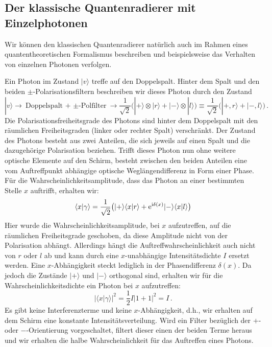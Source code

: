 \subsection{Der klassische Quantenradierer mit Einzelphotonen}

Wir k\"onnen den klassischen Quantenradierer nat\"urlich auch im Rahmen eines
quantentheoretischen Formalismus beschreiben und beispielsweise das Verhalten von
einzelnen Photonen verfolgen. 

Ein Photon im Zustand $|v\rangle$ treffe auf den Doppelspalt. Hinter dem Spalt und den beiden
$\pm$-Polarisationsfiltern beschreiben wir dieses Photon durch den Zustand
\begin{equation}
\label{eq_DSsingle1}
          |v \rangle \longrightarrow \mbox{Doppelspalt + $\pm$-Polfilter} \longrightarrow 
              \frac{1}{\sqrt{2}} \big(  |+\rangle \otimes |r\rangle + |-\rangle \otimes |l\rangle \big) 
              \equiv \frac{1}{\sqrt{2}} \big(  |+ , r\rangle + |- , l\rangle \big)   \, .
\end{equation}
Die Polarisationsfreiheitsgrade des Photons sind hinter dem Doppelspalt mit den
r\"aumlichen Freiheitsgraden (linker oder rechter Spalt) verschr\"ankt. Der Zustand des Photons
besteht aus zwei Anteilen, die sich jeweils auf einen Spalt und die dazugeh\"orige Polarisation
beziehen. Trifft dieses Photon nun ohne weitere optische Elemente auf den Schirm,
besteht zwischen den beiden Anteilen eine vom Auftreffpunkt abh\"angige optische 
Wegl\"angendifferenz in Form einer Phase. F\"ur die Wahr\-schein\-lich\-keits\-ampli\-tude, dass das Photon
an einer bestimmten Stelle $x$ auftrifft, erhalten wir:
\begin{equation}
\label{eq_DSsingle2}
   \langle x | \gamma \rangle = \frac{1}{\sqrt{2}}
               \big(  |+ \rangle \langle x | r\rangle +{\rm e}^{{\rm i}\delta(x)} |- \rangle \langle x  | l\rangle \big)
\end{equation}
Hier wurde die Wahrscheinlichkeitsamplitude, bei $x$ aufzutreffen, auf die r\"aumlichen Freiheitsgrade 
geschoben, da diese Amplitude nicht von der Polarisation abh\"angt. Allerdings h\"angt die
Auftreffwahrscheinlichkeit auch nicht von $r$ oder $l$ ab und kann durch eine $x$-unabh\"angige
Intensit\"atsdichte $I$ ersetzt werden. Eine $x$-Abh\"angigkeit steckt lediglich in der
Phasendifferenz $\delta(x)$. Da jedoch die Zust\"ande $|+\rangle$ und $|-\rangle$
orthogonal sind, erhalten wir f\"ur die Wahrscheinlichkeitsdichte ein Photon bei $x$ aufzutreffen:
\begin{equation}
  | \langle x | \gamma \rangle |^2 =  \frac{1}{2}  I  \big| 1 +1 \big|^2  = I \, .
\end{equation}
Es gibt keine Interferenzterme und keine $x$-Abh\"angigkeit, d.h., wir erhalten auf dem Schirm eine 
konstante Intensit\"atsverteilung. Wird ein Filter bez\"uglich der $+$- oder
$-$-Orientierung vorgeschaltet, filtert dieser einen der beiden Terme heraus und wir erhalten die halbe
Wahrscheinlichkeit f\"ur das Auftreffen eines Photons. 

